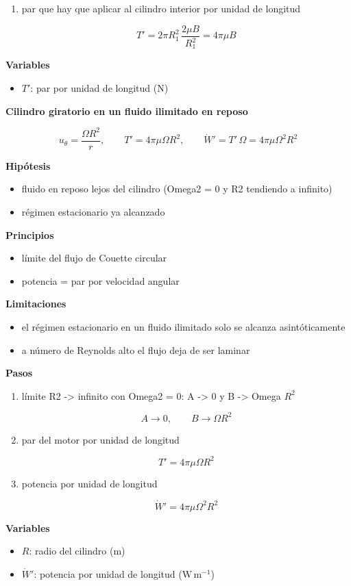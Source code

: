 \documentclass[10pt,openany]{book}
\begin{document}
\begin{tcolorbox}[title={Desarrollos del modelo}, studiumdef, breakable]
\begin{enumerate}
\[
\tau_{r\theta} = -\frac{2\mu B}{r^{2}}
\]
\item
par que hay que aplicar al cilindro interior por unidad de longitud

\[
T' = 2\pi R_1^{2}\,\frac{2\mu B}{R_1^{2}} = 4\pi\mu B
\]
\end{enumerate}

\noindent\textbf{Variables}
\begin{itemize}
\item $T'$: par por unidad de longitud ($\mathrm{N}$)
\end{itemize}



\noindent\textbf{Cilindro giratorio en un fluido ilimitado en reposo}

\[
u_\theta = \frac{\Omega R^{2}}{r},\qquad T' = 4\pi\mu\Omega R^{2},\qquad \dot W' = T'\,\Omega = 4\pi\mu\Omega^{2}R^{2}
\]

\noindent\textbf{Hipótesis}
\begin{itemize}
\item fluido en reposo lejos del cilindro (Omega2 = 0 y R2 tendiendo a infinito)
\item régimen estacionario ya alcanzado
\end{itemize}

\noindent\textbf{Principios}
\begin{itemize}
\item límite del flujo de Couette circular
\item potencia = par por velocidad angular
\end{itemize}

\noindent\textbf{Limitaciones}
\begin{itemize}
\item el régimen estacionario en un fluido ilimitado solo se alcanza asintóticamente
\item a número de Reynolds alto el flujo deja de ser laminar
\end{itemize}

\noindent\textbf{Pasos}
\begin{enumerate}
\item
límite R2 -> infinito con Omega2 = 0: A -> 0 y B -> Omega \(R^2\)

\[
A \to 0,\qquad B \to \Omega R^{2}
\]
\item
par del motor por unidad de longitud

\[
T' = 4\pi\mu\Omega R^{2}
\]
\item
potencia por unidad de longitud

\[
\dot W' = 4\pi\mu\Omega^{2}R^{2}
\]
\end{enumerate}

\noindent\textbf{Variables}
\begin{itemize}
\item $R$: radio del cilindro ($\mathrm{m}$)
\item $\dot W'$: potencia por unidad de longitud ($\mathrm{W}\,\mathrm{m}^{-1}$)
\end{itemize}


\end{tcolorbox}
\end{document}
